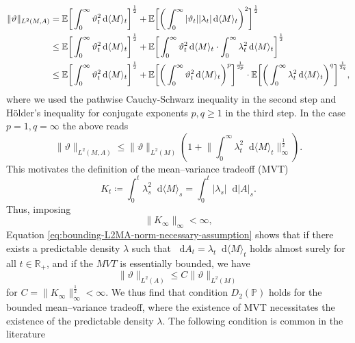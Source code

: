 \documentclass[11pt,a4paper,twoside,openany]{report}
\numberwithin{equation}{section}
\newcommand{\diff}{\mathop{}\!\mathrm{d}}
\theoremstyle{plain} %
\theoremstyle{definition} %
\theoremstyle{remark} %
\begin{document}
\begin{align}\label{eq:bounding-L2MA-norm-necessary-assumption}
\lVert \vartheta\rVert_{L^2(M,A)}
 &=\mathbb{E}\bigg[\int_0^{\infty} \vartheta_t^2\diff \langle M\rangle_t\bigg]^{\frac{1}{2}}
 +\mathbb{E}\bigg[\bigg(\int_0^{\infty} |\vartheta_t||\lambda_t|\diff\langle M\rangle_t\bigg)^2\bigg]^{\frac{1}{2}}\\
&\leq\mathbb{E}\bigg[\int_0^{\infty} \vartheta_t^2\diff \langle M\rangle_t\bigg]^{\frac{1}{2}}
 +\mathbb{E}\bigg[\int_0^{\infty}\vartheta_t^2\diff \langle M\rangle_t\cdot\int_0^{\infty}\lambda_t^2\diff \langle M\rangle_t\bigg]^{\frac{1}{2}}\notag \\
&\leq\mathbb{E}\bigg[\int_0^{\infty} \vartheta_t^2\diff \langle M\rangle_t\bigg]^{\frac{1}{2}}
 +\mathbb{E}\bigg[\bigg(\int_0^{\infty}\vartheta_t^2\diff \langle M\rangle_t\bigg)^{p}\bigg]^{\frac{1}{2p}}\cdot\mathbb{E}\bigg[\bigg(\int_0^{\infty}\lambda_t^2\diff \langle M\rangle_t\bigg)^{q}\bigg]^{\frac{1}{2q}}\notag 
,
\end{align}
where we used the pathwise Cauchy-Schwarz inequality in the second step and Hölder's inequality for conjugate exponents \(p,q\geq 1\) in the third step. In the case \(p=1,q=\infty\) the above reads
\begin{equation*}
    \lVert \vartheta\rVert_{L^2(M,A)}\leq\lVert \vartheta\rVert_{L^2(M)}\left(1+\bigg\lVert\int_0^{\infty}\lambda_t^2\diff \langle M\rangle_t\bigg\rVert_{\infty}^{\frac{1}{2}}\right).
\end{equation*}
This motivates the definition of the mean--variance tradeoff (MVT)  
\begin{equation*}
    K_t\coloneqq\int_0^{t}\lambda_s^2\diff \langle M\rangle_s=\int_0^{t}|\lambda_s|\diff |A|_s.
\end{equation*}
Thus, imposing
\begin{equation*}
    \lVert K_{\infty}\rVert_{\infty}<\infty,
\end{equation*}
Equation \eqref{eq:bounding-L2MA-norm-necessary-assumption} shows that if there exists a predictable density \(\lambda\) such that \(\diff A_t=\lambda_t\diff\langle M\rangle_t\) holds almost surely for all \(t\in\mathbb{R}_+\), and if the \(MVT\) is essentially bounded, we have
\begin{equation*}
    \lVert \vartheta\rVert_{L^2(A)}\leq C\lVert \vartheta\rVert_{L^2(M)}
\end{equation*} 
for \(C=\lVert K_{\infty}\rVert_{\infty}^{\frac{1}{2}}<\infty\). 
We thus find that condition \(D_2(\mathbb{P})\) holds for the bounded mean--variance tradeoff, where the existence of MVT necessitates the existence of the predictable density \(\lambda\).  The following condition is common in the literature
\end{document}
